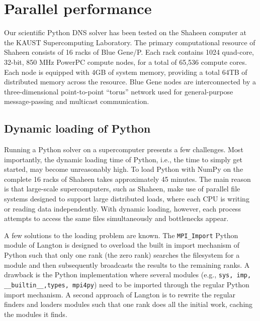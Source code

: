 \documentclass[final,3p,times,twocolumn]{elsarticle}
\newcommand{\inpyth}{\lstinline[style=inlinestyle]} %[]%
\begin{document}
\section{Parallel performance}
Our scientific Python DNS solver has been tested on the Shaheen computer at the 
KAUST Supercomputing Laboratory. The primary computational resource of Shaheen 
consists of 16 racks of Blue Gene/P. Each rack contains 1024 quad-core, 32-bit, 
850 MHz PowerPC compute nodes, for a total of 65,536 compute cores. Each node 
is equipped with 4GB of system memory, providing a total 64TB of distributed 
memory across the resource. Blue Gene nodes are interconnected by a 
three-dimensional point-to-point ``torus'' network used for general-purpose 
message-passing and multicast communication. 


\subsection{Dynamic loading of Python}
Running a Python solver on a supercomputer presents a few challenges. Most 
importantly, the dynamic loading time of Python, i.e., the time to simply get 
started, may become unreasonably high. To load Python with NumPy on the 
complete 16 racks of Shaheen takes approximately 45 minutes. The main reason is 
that large-scale supercomputers, such as Shaheen, make use of parallel file 
systems designed to support large distributed loads, where each CPU is writing 
or reading data independently. With dynamic loading, however, each process 
attempts to access the same files simultaneously and bottlenecks appear.

A few solutions to the loading problem are known. The \inpyth{MPI_Import} 
Python module of Langton \cite{mpi_import} is designed to overload the built in 
import mechanism of Python such that only one rank (the zero rank) searches the 
filesystem for a module and then subsequently broadcasts the results to the 
remaining ranks. A drawback is the Python implementation where several modules 
(e.g., \inpyth{sys, imp, __builtin__,types, mpi4py}) need to be imported 
through the regular Python import mechanism. A second approach of Langton is to 
rewrite the regular finders and loaders modules such that one rank does all the 
initial work, caching the modules it finds.
\end{document}
